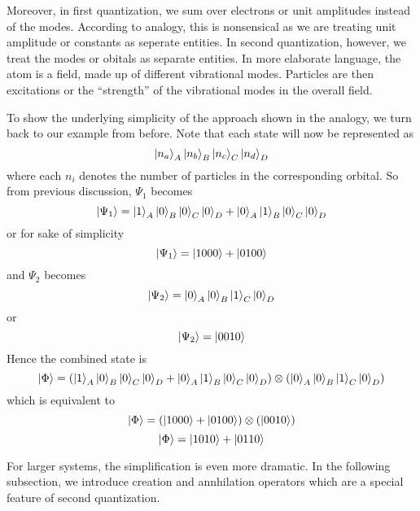 \documentclass{article}
\begin{document}
    Moreover, in first quantization, we sum over electrons or unit
    amplitudes instead of the modes. According to analogy, this is nonsensical
    as we are treating unit amplitude or constants as seperate entities. In
    second quantization, however, we treat the modes or obitals as separate
    entities. In more elaborate language, the atom is a field, made up of
    different vibrational modes. Particles are then excitations or the
    ``strength'' of the vibrational modes in the overall field.

    To show the underlying simplicity of the approach shown in the analogy,
   we turn back to our example from before.
   Note that each state will now be represented as
   \[\ket{n_a}_A\ket{n_b}_B\ket{n_c}_C\ket{n_d}_D\]
   where each \(n_i\) denotes the number of particles in the corresponding orbital.
   So from previous discussion, \(\Psi_1\) becomes
   \[\ket{\Psi_1} = \ket{1}_A\ket{0}_B\ket{0}_C\ket{0}_D +
   \ket{0}_A\ket{1}_B\ket{0}_C\ket{0}_D\]
   or for sake of simplicity
   \[\ket{\Psi_1} = \ket{1000} + \ket{0100}\]
   and \(\Psi_2\) becomes
   \[\ket{\Psi_2} = \ket{0}_A\ket{0}_B\ket{1}_C\ket{0}_D\]
   or
   \[\ket{\Psi_2} = \ket{0010}\]
   Hence the combined state is
   \[\ket{\Phi} = (\ket{1}_A\ket{0}_B\ket{0}_C\ket{0}_D + \ket{0}_A\ket{1}_B\ket{0}_C\ket{0}_D)\otimes(\ket{0}_A\ket{0}_B\ket{1}_C\ket{0}_D) \]
   which is equivalent to
   \[\ket{\Phi} = (\ket{1000} + \ket{0100})\otimes(\ket{0010})\]
   \[\ket{\Phi} = \ket{1010} + \ket{0110}\]

   For larger systems, the simplification is even more dramatic. In the
   following subsection, we introduce creation and annhilation operators
   which are a special feature of second quantization.
\end{document}

